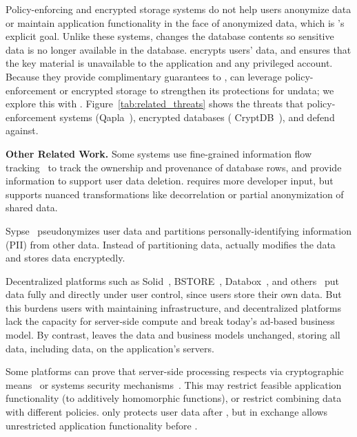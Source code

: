 Policy-enforcing and encrypted storage systems do not help users anonymize data
or maintain application functionality in the face of anonymized data, which is
\sys's explicit goal.
%
Unlike these systems, \sys changes the database contents so sensitive data is no
longer available in the database.
%
\sys encrypts users' \xxed data, and ensures that the key material is
unavailable to the application and any privileged account.
%
Because they provide complimentary guarantees to \sys, \sys can leverage
policy-enforcement or encrypted storage to strengthen its protections for
un\xxed data; we explore this with \syscrypt \newstuff{(\S\ref{s:eval-cryptdb})}.
%
Figure~\ref{tab:related_threats} shows the threats that policy-enforcement
systems (\eg Qapla~\cite{qapla}), encrypted databases (\eg
CryptDB~\cite{cryptdb}), and \sys defend against.
%

%



\textbf{Other Related Work.}
%
Some systems use fine-grained information flow tracking~\cite{schengendb} to
track the ownership and provenance of database rows, and provide information to
support user data deletion.
%
\sys requires more developer input, but supports nuanced transformations like
decorrelation or partial anonymization of shared data.
%

%
Sypse~\cite{sypse} pseudonymizes user data and partitions personally-identifying
information (PII) from other data.
%
Instead of partitioning data, \sys actually modifies the data and stores \xxed
data encryptedly.
%

%
Decentralized platforms such as Solid~\cite{solid}, BSTORE~\cite{bstore},
Databox~\cite{databox}, and others~\cite{diy, amber, oort, w5, blockstack} put
data fully and directly under user control, since users store their own data.
%
But this burdens users with maintaining infrastructure, and decentralized platforms
lack the capacity for server-side compute and break today's ad-based
business model.
%
By contrast, \sys leaves the data and business models unchanged,
storing all data, including \xxed data, on the application's servers.
%

%
Some platforms can prove that server-side processing respects
 via cryptographic means~\cite{zeph} or
systems security mechanisms~\cite{riverbed}.
%
This may restrict feasible application functionality (\eg to additively
homomorphic functions), or restrict combining data with different policies.
%
\sys only protects user data after \xxing, but in exchange allows unrestricted
application functionality before \xxing.
%

\fi
\fi